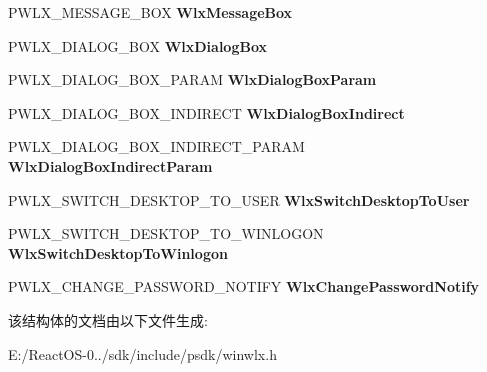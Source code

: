 \begin{DoxyCompactItemize}
\item 
\mbox{\label{struct___w_l_x___d_i_s_p_a_t_c_h___v_e_r_s_i_o_n__1__0_ace17954d84a31c944674e0ab1d4108a5}} 
P\+W\+L\+X\+\_\+\+M\+E\+S\+S\+A\+G\+E\+\_\+\+B\+OX {\bfseries Wlx\+Message\+Box}
\item 
\mbox{\label{struct___w_l_x___d_i_s_p_a_t_c_h___v_e_r_s_i_o_n__1__0_afae404bafffeff86d35431bee11b3c00}} 
P\+W\+L\+X\+\_\+\+D\+I\+A\+L\+O\+G\+\_\+\+B\+OX {\bfseries Wlx\+Dialog\+Box}
\item 
\mbox{\label{struct___w_l_x___d_i_s_p_a_t_c_h___v_e_r_s_i_o_n__1__0_a7fb41abb19a38936efeb4b6ac7cccdf8}} 
P\+W\+L\+X\+\_\+\+D\+I\+A\+L\+O\+G\+\_\+\+B\+O\+X\+\_\+\+P\+A\+R\+AM {\bfseries Wlx\+Dialog\+Box\+Param}
\item 
\mbox{\label{struct___w_l_x___d_i_s_p_a_t_c_h___v_e_r_s_i_o_n__1__0_a190836bb82b33bb20900fafece290de3}} 
P\+W\+L\+X\+\_\+\+D\+I\+A\+L\+O\+G\+\_\+\+B\+O\+X\+\_\+\+I\+N\+D\+I\+R\+E\+CT {\bfseries Wlx\+Dialog\+Box\+Indirect}
\item 
\mbox{\label{struct___w_l_x___d_i_s_p_a_t_c_h___v_e_r_s_i_o_n__1__0_a1d30f92d28a08463f8c13ed23ed7d042}} 
P\+W\+L\+X\+\_\+\+D\+I\+A\+L\+O\+G\+\_\+\+B\+O\+X\+\_\+\+I\+N\+D\+I\+R\+E\+C\+T\+\_\+\+P\+A\+R\+AM {\bfseries Wlx\+Dialog\+Box\+Indirect\+Param}
\item 
\mbox{\label{struct___w_l_x___d_i_s_p_a_t_c_h___v_e_r_s_i_o_n__1__0_a9a176dd7f02d5d6e5fe3addfa268b5c8}} 
P\+W\+L\+X\+\_\+\+S\+W\+I\+T\+C\+H\+\_\+\+D\+E\+S\+K\+T\+O\+P\+\_\+\+T\+O\+\_\+\+U\+S\+ER {\bfseries Wlx\+Switch\+Desktop\+To\+User}
\item 
\mbox{\label{struct___w_l_x___d_i_s_p_a_t_c_h___v_e_r_s_i_o_n__1__0_a0d9233d586bc2b26508d6e0bd4e9a1e2}} 
P\+W\+L\+X\+\_\+\+S\+W\+I\+T\+C\+H\+\_\+\+D\+E\+S\+K\+T\+O\+P\+\_\+\+T\+O\+\_\+\+W\+I\+N\+L\+O\+G\+ON {\bfseries Wlx\+Switch\+Desktop\+To\+Winlogon}
\item 
\mbox{\label{struct___w_l_x___d_i_s_p_a_t_c_h___v_e_r_s_i_o_n__1__0_af5c72886dabf3e8c56592b905923747f}} 
P\+W\+L\+X\+\_\+\+C\+H\+A\+N\+G\+E\+\_\+\+P\+A\+S\+S\+W\+O\+R\+D\+\_\+\+N\+O\+T\+I\+FY {\bfseries Wlx\+Change\+Password\+Notify}
\end{DoxyCompactItemize}


该结构体的文档由以下文件生成\+:\begin{DoxyCompactItemize}
\item 
E\+:/\+React\+O\+S-\/0../sdk/include/psdk/winwlx.\+h\end{DoxyCompactItemize}
